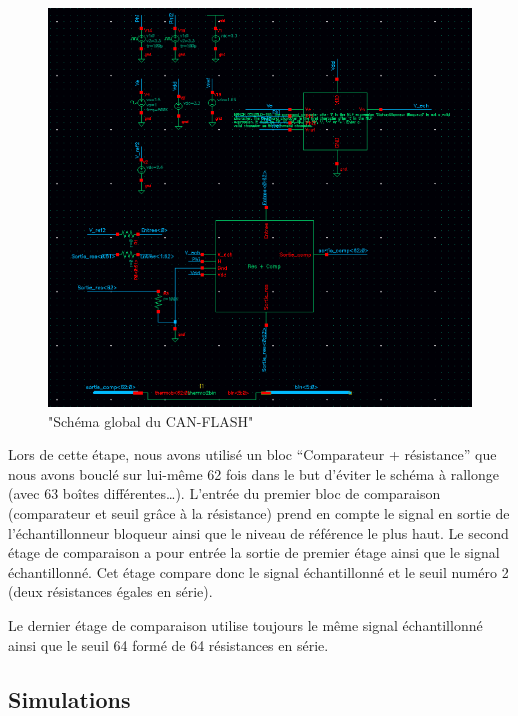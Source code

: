 \documentclass[11pt]{article}
\begin{document}
\begin{figure}[!htb]
\begin{center}
  \includegraphics[scale=0.50]{schema_final.png}
  \caption{"Sch\'ema global du CAN-FLASH"}
\end{center}
\end{figure}

Lors de cette \'etape, nous avons utilis\'e un bloc ``Comparateur + r\'esistance'' que nous avons boucl\'e
sur lui-m\^eme 62 fois dans le but d'\'eviter le sch\'ema \`a rallonge (avec 63 bo\^ites diff\'erentes…).
L'entr\'ee du premier bloc de comparaison (comparateur et seuil gr\^ace \`a la r\'esistance) prend en compte
le signal en sortie de l'\'echantillonneur bloqueur ainsi que le niveau de r\'ef\'erence le plus haut.
Le second \'etage de comparaison a pour entr\'ee la sortie de premier \'etage ainsi que le signal \'echantillonn\'e.
Cet \'etage compare donc le signal \'echantillonn\'e et le seuil num\'ero 2 (deux r\'esistances \'egales en s\'erie).

Le dernier \'etage de comparaison utilise toujours le m\^eme signal \'echantillonn\'e ainsi que le seuil 64 form\'e
de 64 r\'esistances en s\'erie.

\subsection{Simulations}
\end{document}
